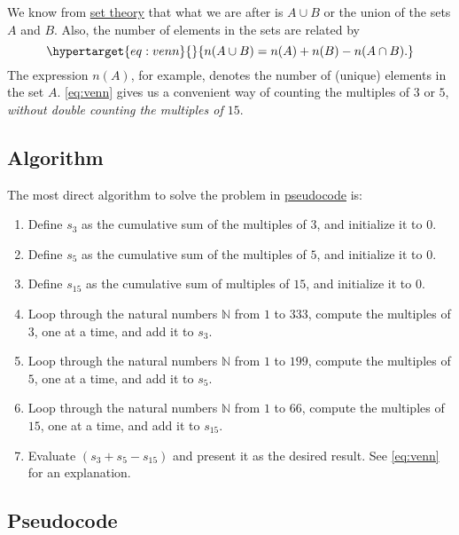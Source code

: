 \documentclass[
  a4paper,
]{article}
\begin{document}
We know from \href{https://en.wikipedia.org/wiki/Set_theory}{set theory}
that what we are after is \(A \cup B\) or the union of the sets \(A\)
and \(B\). Also, the number of elements in the sets are related by
\begin{equation}\protect\hypertarget{eq:venn}{}{
n(A \cup B) = n(A) + n(B) - n(A\cap B).
}\label{eq:venn}\end{equation} The expression \(n(A)\), for example,
denotes the number of (unique) elements in the set \(A\). \cref{eq:venn}
gives us a convenient way of counting the multiples of \(3\) or \(5\),
\emph{without double counting the multiples of \(15\)}.

\hypertarget{algorithm}{%
\subsection{Algorithm}\label{algorithm}}

The most direct algorithm to solve the problem in
\href{https://en.wikipedia.org/wiki/Pseudocode}{pseudocode} is:

\begin{enumerate}
\item
  Define \(s_3\) as the cumulative sum of the multiples of \(3\), and
  initialize it to \(0\).
\item
  Define \(s_5\) as the cumulative sum of the multiples of \(5\), and
  initialize it to \(0\).
\item
  Define \(s_{15}\) as the cumulative sum of multiples of \(15\), and
  initialize it to \(0\).
\item
  Loop through the natural numbers \(\mathbb{N}\) from \(1\) to \(333\),
  compute the multiples of \(3\), one at a time, and add it to \(s_3\).
\item
  Loop through the natural numbers \(\mathbb{N}\) from \(1\) to \(199\),
  compute the multiples of \(5\), one at a time, and add it to \(s_5\).
\item
  Loop through the natural numbers \(\mathbb{N}\) from \(1\) to \(66\),
  compute the multiples of \(15\), one at a time, and add it to
  \(s_{15}\).
\item
  Evaluate \((s_3 + s_5 - s_{15})\) and present it as the desired
  result. See \cref{eq:venn} for an explanation.
\end{enumerate}

\hypertarget{pseudocode}{%
\subsection{Pseudocode}\label{pseudocode}}
\end{document}
